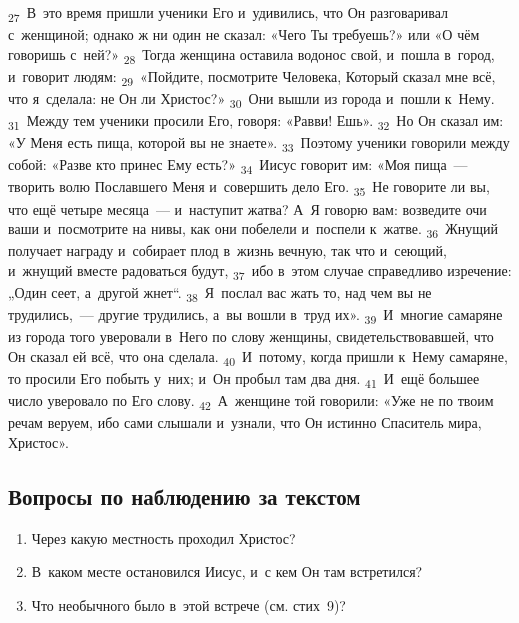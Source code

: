 \documentclass[a4paper,12pt]{article}
\begin{document}
\textsubscript{27}~В~это время пришли ученики Его и~удивились, что Он разговаривал с~женщиной; однако ж ни один не сказал: «Чего Ты требуешь?» или «О чём говоришь с~ней?»
\textsubscript{28}~Тогда женщина оставила водонос свой, и~пошла в~город, и~говорит людям:
\textsubscript{29}~«Пойдите, посмотрите Человека, Который сказал мне всё, что я~сделала: не Он ли Христос?»
\textsubscript{30}~Они вышли из города и~пошли к~Нему.
\textsubscript{31}~Между тем ученики просили Его, говоря: «Равви! Ешь».
\textsubscript{32}~Но Он сказал им: «У Меня есть пища, которой вы не знаете».
\textsubscript{33}~Поэтому ученики говорили между собой: «Разве кто принес Ему есть?»
\textsubscript{34}~Иисус говорит им: «Моя пища~--- творить волю Пославшего Меня и~совершить дело Его.
\textsubscript{35}~Не говорите ли вы, что ещё четыре месяца~--- и~наступит жатва? А~Я говорю вам: возведите очи ваши и~посмотрите на нивы, как они побелели и~поспели к~жатве.
\textsubscript{36}~Жнущий получает награду и~собирает плод в~жизнь вечную, так что и~сеющий, и~жнущий вместе радоваться будут,
\textsubscript{37}~ибо в~этом случае справедливо изречение: „Один сеет, а~другой жнет“.
\textsubscript{38}~Я~послал вас жать то, над чем вы не трудились,~--- другие трудились, а~вы вошли в~труд их».
\textsubscript{39}~И~многие самаряне из города того уверовали в~Него по слову женщины, свидетельствовавшей, что Он сказал ей всё, что она сделала.
\textsubscript{40}~И~потому, когда пришли к~Нему самаряне, то просили Его побыть у~них; и~Он пробыл там два дня.
\textsubscript{41}~И~ещё большее число уверовало по Его слову.
\textsubscript{42}~А~женщине той говорили: «Уже не по твоим речам веруем, ибо сами слышали и~узнали, что Он истинно Спаситель мира, Христос». 


\subsection*{Вопросы по наблюдению за текстом}
\begin{enumerate}
    \item Через какую местность проходил Христос? 
    
    \myline
    
    \item В~каком месте остановился Иисус, и~с кем Он там встретился? 
    
    \myline
    
    \myline
    \item Что необычного было в~этой встрече (см. стих~9)? 
    
    \myline
    
    \myline
\end{enumerate}
\end{document}
